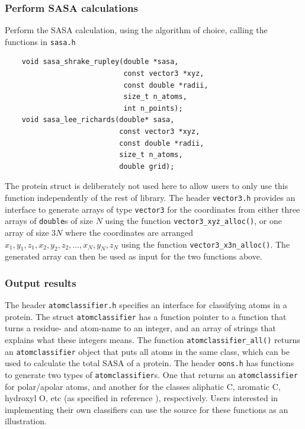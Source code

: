 \documentclass[a4paper,11pt]{article}
\begin{document}
\subsubsection{Perform SASA calculations}
Perform the SASA calculation, using the algorithm of choice, calling
the functions in \texttt{sasa.h}
\begin{verbatim}
    void sasa_shrake_rupley(double *sasa,
                            const vector3 *xyz,
                            const double *radii,
                            size_t n_atoms,
                            int n_points);
    void sasa_lee_richards(double* sasa,
                           const vector3 *xyz,
                           const double *radii,
                           size_t n_atoms,
                           double grid);

\end{verbatim}
The protein struct is deliberately not used here to allow users to
only use this function independently of the rest of library. The
header \texttt{vector3.h} provides an interface to generate arrays of
type \texttt{vector3} for the coordinates from either three arrays of
\texttt{double}s of size $N$ using the function
\texttt{vector3\_xyz\_alloc()}, or one array of size $3N$ where the
coordinates are arranged $x_1,y_1,z_1,x_2,y_2,z_2,\ldots,x_N,y_N,z_N$
using the function \texttt{vector3\_x3n\_alloc()}. The generated array
can then be used as input for the two functions above.

\subsubsection{Output results}
The header \texttt{atomclassifier.h} specifies an interface for
classifying atoms in a protein. The struct \texttt{atomclassifier} has
a function pointer to a function that turns a residue- and atom-name
to an integer, and an array of strings that explains what these
integers means. The function \texttt{atomclassifier\_all()} returns an
\texttt{atomclassifier} object that puts all atoms in the same class,
which can be used to calculate the total SASA of a protein. The header
\texttt{oons.h} has functions to generate two types of
\texttt{atomclassifier}s. One that returns an \texttt{atomclassifier}
for polar/apolar atoms, and another for the classes aliphatic C,
aromatic C, hydroxyl O, etc (as specified in reference \cite{OONS}),
respectively. Users interested in implementing their own classifiers
can use the source for these functions as an illustration.
\end{document}
